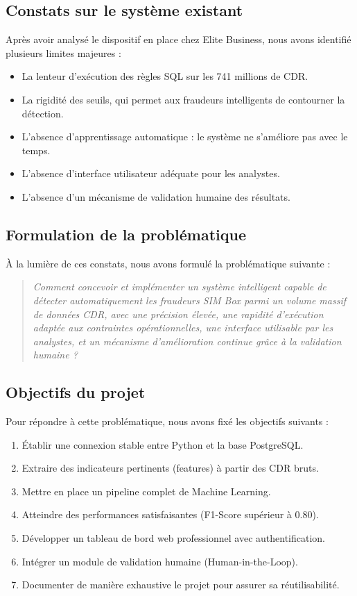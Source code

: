 \documentclass[12pt, oneside, a4paper]{report}
\begin{document}
\subsection{Constats sur le système existant}
Après avoir analysé le dispositif en place chez Elite Business, nous avons identifié plusieurs limites majeures :
\begin{itemize}
\item La lenteur d'exécution des règles SQL sur les 741 millions de CDR.
\item La rigidité des seuils, qui permet aux fraudeurs intelligents de contourner la détection.
\item L'absence d'apprentissage automatique : le système ne s'améliore pas avec le temps.
\item L'absence d'interface utilisateur adéquate pour les analystes.
\item L'absence d'un mécanisme de validation humaine des résultats.
\end{itemize}

\subsection{Formulation de la problématique}
À la lumière de ces constats, nous avons formulé la problématique suivante :

\begin{quote}
\textit{Comment concevoir et implémenter un système intelligent capable de détecter automatiquement les fraudeurs SIM Box parmi un volume massif de données CDR, avec une précision élevée, une rapidité d'exécution adaptée aux contraintes opérationnelles, une interface utilisable par les analystes, et un mécanisme d'amélioration continue grâce à la validation humaine ?}
\end{quote}

\subsection{Objectifs du projet}
Pour répondre à cette problématique, nous avons fixé les objectifs suivants :
\begin{enumerate}
\item Établir une connexion stable entre Python et la base PostgreSQL.
\item Extraire des indicateurs pertinents (features) à partir des CDR bruts.
\item Mettre en place un pipeline complet de Machine Learning.
\item Atteindre des performances satisfaisantes (F1-Score supérieur à 0.80).
\item Développer un tableau de bord web professionnel avec authentification.
\item Intégrer un module de validation humaine (Human-in-the-Loop).
\item Documenter de manière exhaustive le projet pour assurer sa réutilisabilité.
\end{enumerate}
\end{document}
